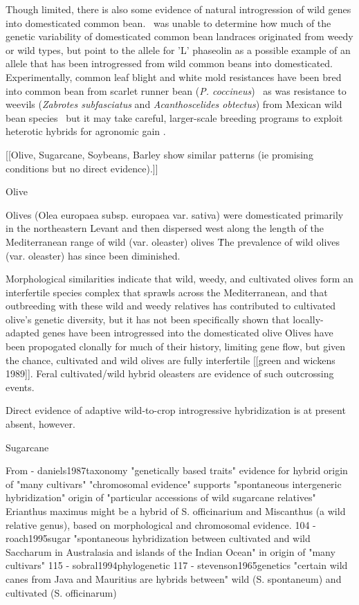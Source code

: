 \documentclass[11pt]{article}
\begin{document}
Though limited, there is also some evidence of natural introgression of wild genes into domesticated common bean.
\cite{papa2003asymmetry}\ was unable to determine how much of the genetic variability of domesticated common bean landraces originated from weedy or wild types, but point to the allele for 'L' phaseolin as a possible example of an allele that has been introgressed from wild common beans into domesticated.
Experimentally, common leaf blight and white mold resistances have been bred into common bean from scarlet runner bean (\emph{P. coccineus}) \cite{park1987transfer, schwartz2006inheritance}\, as was resistance to weevils (\emph{Zabrotes subfasciatus} and \emph{Acanthoscelides obtectus}) from Mexican wild bean species \cite{kornegay1991inheritance}\, but it may take careful, larger-scale breeding programs to exploit heterotic hybrids for agronomic gain \cite{paredes1995extensive}.





[[Olive, Sugarcane, Soybeans, Barley show similar patterns (ie promising conditions but no direct evidence).]]

Olive

Olives (Olea europaea subsp. europaea var. sativa) were domesticated primarily in the northeastern Levant and then dispersed west along the length of the Mediterranean range of wild (var. oleaster) olives \cite{besnard2013complex}\.
The prevalence of wild olives (var. oleaster) has since been diminished.

Morphological similarities indicate that wild, weedy, and cultivated olives form an interfertile species complex that sprawls across the Mediterranean, and that outbreeding with these wild and weedy relatives has contributed to cultivated olive's genetic diversity, but it has not been specifically shown that locally-adapted genes have been introgressed into the domesticated olive \cite{zohary1975beginnings}\.

Olives have been propogated clonally for much of their history, limiting gene flow, but given the chance, cultivated and wild olives are fully interfertile [[green and wickens 1989]].
Feral cultivated/wild hybrid oleasters are evidence of such outcrossing events.

Direct evidence of adaptive wild-to-crop introgressive hybridization is at present absent, however.




Sugarcane

From \cite{ellstrand1999gene} - daniels1987taxonomy
 "genetically based traits" evidence for hybrid origin of "many cultivars"
 "chromosomal evidence" supports "spontaneous intergeneric hybridization" origin of "particular accessions of wild sugarcane relatives"
 Erianthus maximus might be a hybrid of S. officinarium and Miscanthus (a wild relative genus), based on morphological and chromosomal evidence.
104 - roach1995sugar
 "spontaneous hybridization between cultivated and wild Saccharum in Australasia and islands of the Indian Ocean" in origin of "many cultivars"
115 - sobral1994phylogenetic
117 - stevenson1965genetics
 "certain wild canes from Java and Mauritius are hybrids between" wild (S. spontaneum) and cultivated (S. officinarum)
 
\end{document}
